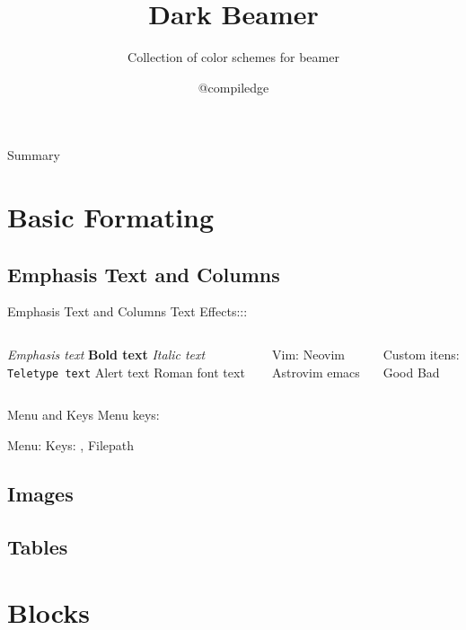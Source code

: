 \documentclass[lang=en-us, solarized-dark,Frankfurt, 90pt]{darkbeamer}
\author{@compiledge}
\title{Dark Beamer}
\subtitle{Collection of color schemes for beamer}
\institute{My University}
\begin{document}
\begin{frame}{}
	\titlepage
\end{frame}

\begin{frame}{Summary}
	\label{contents}
	\tableofcontents
\end{frame}

\section{Basic Formating}
\subsection{Emphasis Text and Columns}
\begin{frame}{Emphasis Text and Columns}
	Text Effects:::
	\begin{columns}[c]
		\begin{outline}
			\1 \emph{Emphasis text}
			\1 \textbf{Bold text}
			\1 \textit{Italic text}
			\1 \texttt{Teletype text}
			\1 \alert{Alert text}
			\1 \textrm{Roman font text}
		\end{outline}
		\column{.45\textwidth}
		\begin{outline}[enumerate]
			\1 Vim:
			\2 Neovim
			\2 Astrovim
			\1 emacs
		\end{outline}
		\begin{outline}
			\1 Custom itens:
			\2[\gd] Good
			\2[\bd] Bad
		\end{outline}
	\end{columns}
\end{frame}

\begin{frame}{Menu and Keys}
    Menu keys:
    \begin{outline}
        \1 Menu: 
		  \1 Keys: , \keys{\ctrl +v}
        \1 Filepath  
    \end{outline}
\end{frame}

\subsection{Images}
\subsection{Tables}

\section{Blocks}
\end{document}
